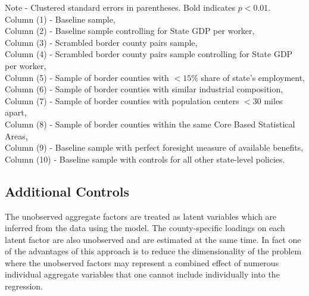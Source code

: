 \documentclass[12pt]{article}
\newcommand{\1}{\mathbf{1}}
\begin{document}
\begin{appendix}
\vspace{0.5cm}\begin{table}[ht]
  \centering
   \caption{Unemployment Benefit Extensions and Unemployment: Results Based on Additive Effects Specification}\label{tab:Benefits_on_unemp_OLS}
\small

\parbox{16.5cm}{\noindent Note - Clustered standard errors in parentheses. Bold indicates $p<0.01$.\\
Column (1) - Baseline sample,\\
Column (2) - Baseline sample controlling for State GDP per worker,\\
Column (3) - Scrambled border county pairs sample,\\
Column (4) - Scrambled border county pairs sample controlling for State GDP per worker,\\
Column (5) - Sample of border counties with  $<15\%$ share of state's employment,\\
Column (6) - Sample of border counties with similar industrial composition,\\
Column (7) - Sample of border counties with population centers $<30$ miles apart,\\
Column (8) - Sample of border counties within the same Core Based Statistical Areas,\\
Column (9) - Baseline sample with perfect foresight measure of available benefits,\\
Column (10) - Baseline sample with controls for all other state-level policies.
}
\vspace{-0.0cm}
\end{table}



\subsection{Additional Controls}

The unobserved aggregate factors are treated as latent variables which are inferred from the data using the model. The county-specific loadings on each latent factor are also unobserved and are estimated at the same time. In fact one of the advantages of this approach is to reduce the dimensionality of the problem where the unobserved factors may represent a combined effect of numerous individual aggregate variables that one cannot include individually into the regression.


\end{appendix}
\end{document}
